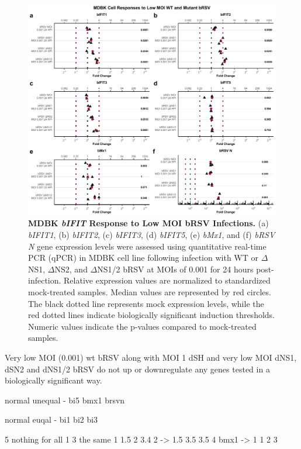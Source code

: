 \begin{figure}
    \centering
    \includegraphics[width=1\linewidth]{07. Chapter 2/Figs/02. Induction/06. mdbk_brsv_low_moi.pdf}
    \caption[MDBK \textit{bIFIT} Response to Low MOI bRSV Infections.]{\textbf{MDBK \textit{bIFIT} Response to Low MOI bRSV Infections.} (a) \textit{bIFIT1}, (b) \textit{bIFIT2}, (c) \textit{bIFIT3}, (d) \textit{bIFIT5}, (e) \textit{bMx1}, and (f) \textit{bRSV N} gene expression levels were assessed using quantitative real-time PCR (qPCR) in MDBK cell line following infection with WT or \(\Delta\)NS1, \(\Delta\)NS2, and \(\Delta\)NS1/2 bRSV at MOIs of 0.001 for 24 hours post-infection. Relative expression values are normalized to standardized mock-treated samples. Median values are represented by red circles. The black dotted line represents mock expression levels, while the red dotted lines indicate biologically significant induction thresholds. Numeric values indicate the p-values compared to mock-treated samples.}
    \label{fig:MDBK responses to low MOI mutant bRSV}
\end{figure}



Very low MOI (0.001) wt bRSV along with MOI 1 dSH and very low MOI dNS1, dSN2 and dNS1/2 bRSV do not up or downregulate any genes tested in a biologically significant way.

normal unequal - bi5 bmx1 brsvn

normal euqal - bi1 bi2 bi3 

5 nothing for all
1 3 the same    1 1.5 2 3.4
2 -> 1.5 3.5 3.5 4
bmx1 -> 1 1 2 3

